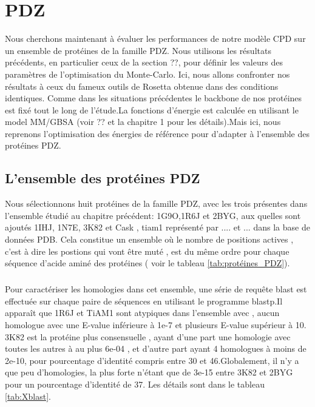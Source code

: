 \chapter{PDZ}
\label{chap:PDZ}
Nous cherchons maintenant à évaluer les performances de notre modèle CPD sur un ensemble de protéines de la famille PDZ. Nous utilisons les résultats précédents, en particulier ceux de la section ??, pour définir les valeurs des paramètres de l'optimisation du Monte-Carlo.  Ici, nous allons confronter nos résultats à ceux  du fameux outils de Rosetta obtenue dans des conditions identiques. Comme dans les situations précédentes le backbone de nos protéines est fixé tout le long de l'étude.La fonctions d'énergie est calculée en utilisant le model MM/GBSA (voir ?? et la chapitre 1 pour les détails).Mais ici, nous reprenons l'optimisation des énergies de référence pour d'adapter à l'ensemble des protéines PDZ.


\section{L'ensemble des protéines PDZ} 

Nous sélectionnons huit protéines de la famille PDZ, avec les trois présentes dans l'ensemble étudié au chapitre précédent: 1G9O,1R6J et 2BYG, aux quelles sont ajoutés 1IHJ, 1N7E, 3K82 et Cask , tiam1 représenté par .... et ... dans la base de données PDB. Cela constitue un ensemble où le nombre de positions actives , c'est à dire les postions qui vont être muté , est du même ordre pour chaque séquence d'acide aminé des protéines ( voir le tableau \ref{tab:protéines_PDZ}).

\paragraph{}
Pour caractériser les homologies dans cet ensemble, une série de requête blast est effectuée sur chaque paire de séquences en utilisant le programme blastp.Il apparaît que 1R6J et TiAM1 sont atypiques dans l'ensemble avec , aucun homologue avec une E-value inférieure à 1e-7 et plusieurs E-value supérieur à 10. 3K82 est la protéine plus consensuelle , ayant d'une part une homologie avec toutes les autres à au plus 6e-04 , et d'autre part ayant 4 homologues à moins de 2e-10, pour pourcentage d'identité compris entre 30 et 46.Globalement, il n'y a que peu d'homologies, la plus forte n'étant que de 3e-15 entre 3K82 et 2BYG pour un pourcentage d'identité de 37. Les détails sont dans le tableau \ref{tab:Xblast}.

